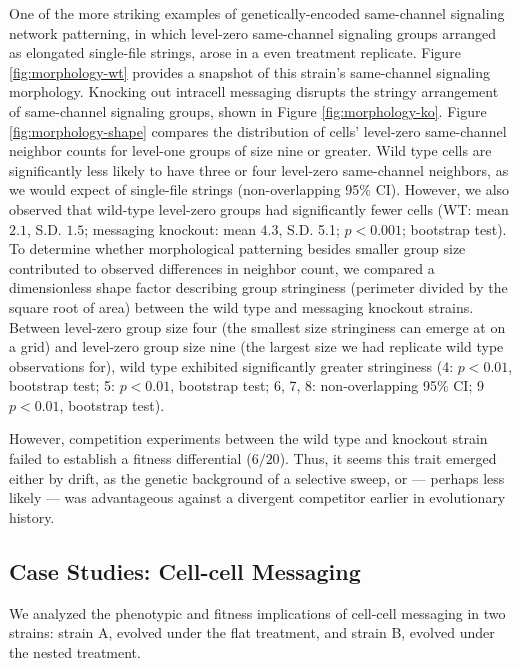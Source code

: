 One of the more striking examples of genetically-encoded same-channel signaling network patterning, in which level-zero same-channel signaling groups arranged as elongated single-file strings, arose in a even treatment replicate.
Figure \ref{fig:morphology-wt} provides a snapshot of this strain's same-channel signaling morphology.
Knocking out intracell messaging disrupts the stringy arrangement of same-channel signaling groups, shown in Figure \ref{fig:morphology-ko}.
Figure \ref{fig:morphology-shape} compares the distribution of cells' level-zero same-channel neighbor counts for level-one groups of size nine or greater.
Wild type cells are significantly less likely to have three or four level-zero same-channel neighbors, as we would expect of single-file strings (non-overlapping 95\% CI).
However, we also observed that wild-type level-zero groups had significantly fewer cells
(WT: mean $2.1$, S.D. $1.5$; messaging knockout: mean $4.3$, S.D. 5.1; $p < 0.001$; bootstrap test).
To determine whether morphological patterning besides smaller group size contributed to observed differences in neighbor count, we compared a dimensionless shape factor describing group stringiness (perimeter divided by the square root of area) between the wild type and messaging knockout strains.
Between level-zero group size four (the smallest size stringiness can emerge at on a grid) and level-zero group size nine (the largest size we had replicate wild type observations for), wild type exhibited significantly greater stringiness
(4: $p < 0.01$, bootstrap test; 5: $p < 0.01$, bootstrap test; 6, 7, 8: non-overlapping 95\% CI; 9 $p < 0.01$, bootstrap test).

However, competition experiments between the wild type and knockout strain failed to establish a fitness differential ($6/20$).
Thus, it seems this trait emerged either by drift, as the genetic background of a selective sweep, or --- perhaps less likely --- was advantageous against a divergent competitor earlier in evolutionary history.

\subsection{Case Studies: Cell-cell Messaging} \label{sec:cell-cell-messaging}



We analyzed the phenotypic and fitness implications of cell-cell messaging in two strains: strain A, evolved under the flat treatment, and strain B, evolved under the nested treatment.

